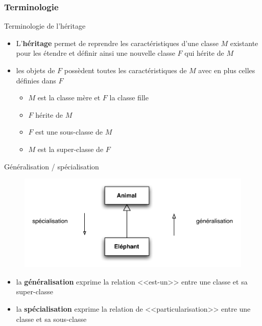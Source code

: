 \subsubsection*{Terminologie}

\begin{frame}{Terminologie de l'héritage}
\begin{itemize}
	\item L'\textbf{héritage} permet de reprendre les caractéristiques d'une classe $M$ existante pour les étendre et définir ainsi une nouvelle classe $F$ qui hérite de $M$
	\item les objets de $F$ possèdent toutes les caractéristiques de $M$ avec en plus celles définies dans $F$
	\begin{itemize}
		\item $M$ est la classe mère et $F$ la classe fille
		\item $F$ hérite de $M$
		\item $F$ est une sous-classe de $M$
		\item $M$ est la super-classe de $F$
	\end{itemize}
\end{itemize}
\end{frame}

\begin{frame}{Généralisation / spécialisation}
\begin{figure}[htbp]
    \begin{center}
      \includegraphics[scale=.45]{fig/genspe.pdf}
    \end{center}
  \end{figure}
\begin{itemize}
	\item la \textbf{généralisation} exprime la relation <<est-un>> entre une classe et sa super-classe
	\item la \textbf{spécialisation} exprime la relation de <<particularisation>> entre une classe et sa sous-classe
\end{itemize}
\end{frame}

